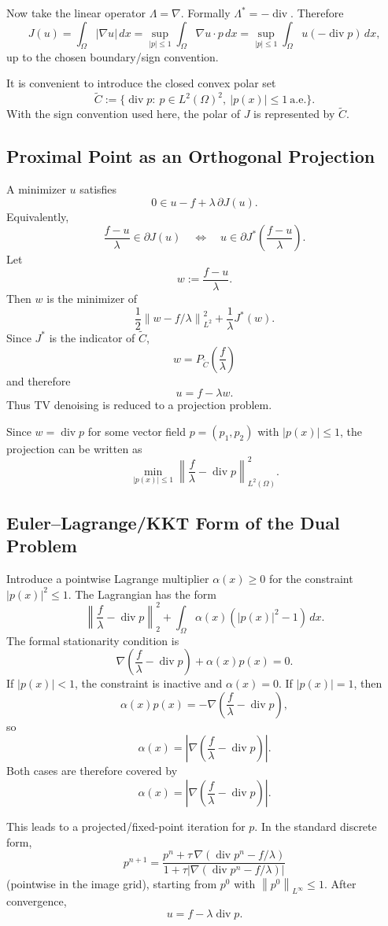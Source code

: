 \documentclass[11pt]{article}
\newcommand{\Om}{\Omega}
\newcommand{\Div}{\operatorname{div}}
\newcommand{\norm}[2][]{\left\lVert #2\right\rVert_{#1}}
\theoremstyle{definition}
\theoremstyle{plain}
\begin{document}
Now take the linear operator $\Lambda=\nabla$. Formally $\Lambda^*=-\Div$. Therefore
\[
J(u)=\int_{\Om}|\nabla u|\,dx
=\sup_{|p|\le1}\int_{\Om}\nabla u\cdot p\,dx
=\sup_{|p|\le1}\int_{\Om}u(-\Div p)\,dx,
\]
up to the chosen boundary/sign convention.

It is convenient to introduce the closed convex polar set
\[
\widetilde C
:=\{\Div p:\ p\in L^2(\Om)^2,\ |p(x)|\le1\ \text{a.e.}\}.
\]
With the sign convention used here, the polar of $J$ is represented by $\widetilde C$.

\subsection{Proximal Point as an Orthogonal Projection}
A minimizer $u$ satisfies
\[
0\in u-f+\lambda\,\partial J(u).
\]
Equivalently,
\[
\frac{f-u}{\lambda}\in\partial J(u)
\quad\Longleftrightarrow\quad
u\in\partial J^*\left(\frac{f-u}{\lambda}\right).
\]
Let
\[
w:=\frac{f-u}{\lambda}.
\]
Then $w$ is the minimizer of
\[
\frac12\norm[L^2]{w-f/\lambda}^2+\frac{1}{\lambda}J^*(w).
\]
Since $J^*$ is the indicator of $\widetilde C$,
\[
 w=P_{\widetilde C}\left(\frac{f}{\lambda}\right)
\]
and therefore
\[
 u=f-\lambda w.
\]
Thus TV denoising is reduced to a projection problem.

Since $w=\Div p$ for some vector field $p=(p_1,p_2)$ with $|p(x)|\le1$, the projection can be written as
\[
\min_{|p(x)|\le1}
\left\|
\frac{f}{\lambda}-\Div p
\right\|_{L^2(\Om)}^2.
\]

\subsection{Euler--Lagrange/KKT Form of the Dual Problem}
Introduce a pointwise Lagrange multiplier $\alpha(x)\ge0$ for the constraint $|p(x)|^2\le1$. The Lagrangian has the form
\[
\left\|\frac{f}{\lambda}-\Div p\right\|_2^2
+\int_{\Om}\alpha(x)(|p(x)|^2-1)\,dx.
\]
The formal stationarity condition is
\[
\nabla\left(\frac{f}{\lambda}-\Div p\right)+\alpha(x)p(x)=0.
\]
If $|p(x)|<1$, the constraint is inactive and $\alpha(x)=0$. If $|p(x)|=1$, then
\[
\alpha(x)p(x)
=-\nabla\left(\frac{f}{\lambda}-\Div p\right),
\]
so
\[
\alpha(x)=
\left|\nabla\left(\frac{f}{\lambda}-\Div p\right)\right|.
\]
Both cases are therefore covered by
\[
\alpha(x)=
\left|\nabla\left(\frac{f}{\lambda}-\Div p\right)\right|.
\]

This leads to a projected/fixed-point iteration for $p$. In the standard discrete form,
\[
 p^{n+1}
 =\frac{
 p^n+\tau\,\nabla\left(\Div p^n-f/\lambda\right)
 }{
 1+\tau\left|\nabla\left(\Div p^n-f/\lambda\right)\right|
 }
\]
(pointwise in the image grid), starting from $p^0$ with $\norm[L^\infty]{p^0}\le1$. After convergence,
\[
u=f-\lambda\Div p.
\]
\end{document}
